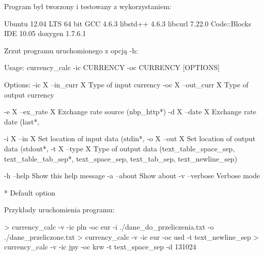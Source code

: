 \begin{DoxyItemize}
\item \-Program był tworzony i testowany z wykorzystaniem\-: \begin{DoxyVerb}
	Ubuntu 12.04 LTS 64 bit
	GCC 4.6.3
	libstd++ 4.6.3
	libcurl 7.22.0
	Code::Blocks IDE 10.05
	doxygen 1.7.6.1
\end{DoxyVerb}

\item \-Zrzut programu uruchomionego z opcją -\/h\-: \begin{DoxyVerb}
Usage:
	currency_calc -ic CURRENCY -oc CURRENCY [OPTIONS]

Options:
	-ic X  --in_curr X	Type of input currency
	-oc X  --out_curr X	Type of output currency

	-e X  --ex_rate X	Exchange rate source (nbp_http*)
	-d X  --date X		Exchange rate date (last*, %

	-i X  --in X		Set location of input data (stdin*, %
	-o X  --out X		Set location of output data (stdout*, %
	-t X  --type X		Type of output data (text_table_space_sep, text_table_tab_sep*, text_space_sep, text_tab_sep, text_newline_sep)

	-h  --help		Show this help message
	-a  --about		Show about
	-v  --verbose		Verbose mode

	*  Default option

\end{DoxyVerb}

\item \-Przykłady uruchomienia programu\-: \begin{DoxyVerb}
	> currency_calc -v -ic pln -oc eur -i ./dane_do_przeliczenia.txt -o ./dane_przeliczone.txt
	> currency_calc -v -ic eur -oc usd -t text_newline_sep
	> currency_calc -v -ic jpy -oc krw -t text_space_sep -d 131024
\end{DoxyVerb}
 
\end{DoxyItemize}